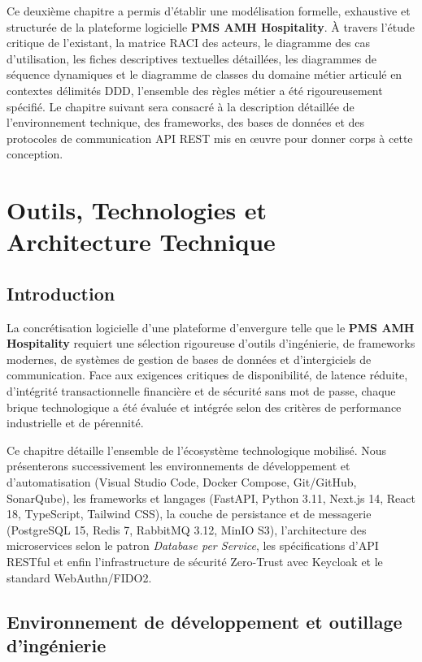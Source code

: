 \documentclass[12pt,a4paper,oneside]{report}
\begin{document}
Ce deuxième chapitre a permis d'établir une modélisation formelle, exhaustive et structurée de la plateforme logicielle \textbf{PMS AMH Hospitality}. À travers l'étude critique de l'existant, la matrice RACI des acteurs, le diagramme des cas d'utilisation, les fiches descriptives textuelles détaillées, les diagrammes de séquence dynamiques et le diagramme de classes du domaine métier articulé en contextes délimités DDD, l'ensemble des règles métier a été rigoureusement spécifié. Le chapitre suivant sera consacré à la description détaillée de l'environnement technique, des frameworks, des bases de données et des protocoles de communication API REST mis en œuvre pour donner corps à cette conception.

\chapter{Outils, Technologies et Architecture Technique}
\label{chap:technologies}

\section{Introduction}

La concrétisation logicielle d'une plateforme d'envergure telle que le \textbf{PMS AMH Hospitality} requiert une sélection rigoureuse d'outils d'ingénierie, de frameworks modernes, de systèmes de gestion de bases de données et d'intergiciels de communication. Face aux exigences critiques de disponibilité, de latence réduite, d'intégrité transactionnelle financière et de sécurité sans mot de passe, chaque brique technologique a été évaluée et intégrée selon des critères de performance industrielle et de pérennité.

Ce chapitre détaille l'ensemble de l'écosystème technologique mobilisé. Nous présenterons successivement les environnements de développement et d'automatisation (Visual Studio Code, Docker Compose, Git/GitHub, SonarQube), les frameworks et langages (FastAPI, Python 3.11, Next.js 14, React 18, TypeScript, Tailwind CSS), la couche de persistance et de messagerie (PostgreSQL 15, Redis 7, RabbitMQ 3.12, MinIO S3), l'architecture des microservices selon le patron \textit{Database per Service}, les spécifications d'API RESTful et enfin l'infrastructure de sécurité Zero-Trust avec Keycloak et le standard WebAuthn/FIDO2.

\section{Environnement de développement et outillage d'ingénierie}
\end{document}
